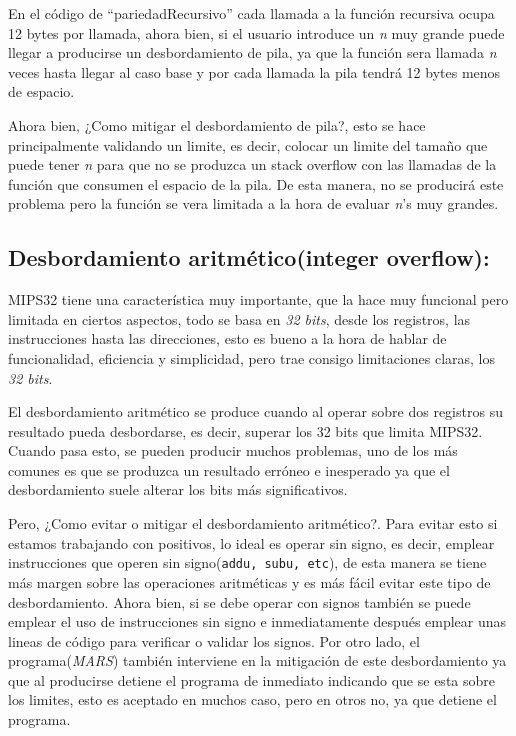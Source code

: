 \documentclass[12pt, a4paper]{article}
\begin{document}
En el código de ``pariedadRecursivo'' cada llamada a la función recursiva ocupa 12 bytes por llamada, ahora bien, si el usuario introduce un {\large\textit{n}} muy grande puede llegar a producirse un desbordamiento de pila, ya que la función sera llamada {\large\textit{n}} veces hasta llegar al caso base y por cada llamada la pila tendrá 12 bytes menos de espacio.

Ahora bien, ¿Como mitigar el desbordamiento de pila?, esto se hace principalmente validando un limite, es decir, colocar un limite del tamaño que puede tener {\large\textit{n}} para que no se produzca un stack overflow con las llamadas de la función que consumen el espacio de la pila. De esta manera, no se producirá este problema pero la función se vera limitada a la hora de evaluar {\large\textit{n}}'s muy grandes.

\subsection{Desbordamiento aritmético(integer overflow):} MIPS32 tiene una característica muy importante, que la hace muy funcional pero limitada en ciertos aspectos, todo se basa en \textit{32 bits}, desde los registros, las instrucciones hasta las direcciones, esto es bueno a la hora de hablar de funcionalidad, eficiencia y simplicidad, pero trae consigo limitaciones claras, los \textit{32 bits}.

El desbordamiento aritmético se produce cuando al operar sobre dos registros su resultado pueda desbordarse, es decir, superar los 32 bits que limita MIPS32. Cuando pasa esto, se pueden producir muchos problemas, uno de los más comunes es que se produzca un resultado erróneo e inesperado ya que el desbordamiento suele alterar los bits más significativos.

Pero, ¿Como evitar o mitigar el desbordamiento aritmético?. Para evitar esto si estamos trabajando con positivos, lo ideal es operar sin signo, es decir, emplear instrucciones que operen sin signo(\lstinline|addu, subu, etc|), de esta manera se tiene más margen sobre las operaciones aritméticas y es más fácil evitar este tipo de desbordamiento. Ahora bien, si se debe operar con signos también se puede emplear el uso de instrucciones sin signo e inmediatamente después emplear unas lineas de código para verificar o validar los signos. Por otro lado, el programa(\textit{MARS}) también interviene en la mitigación de este desbordamiento ya que al producirse detiene el programa de inmediato indicando que se esta sobre los limites, esto es aceptado en muchos caso, pero en otros no, ya que detiene el programa.
\end{document}
